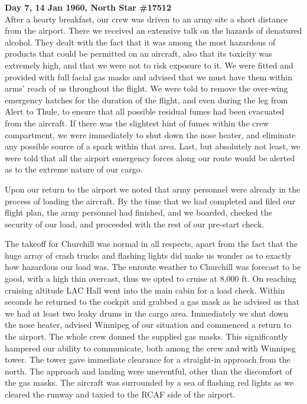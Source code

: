\noindent\textbf{Day 7, 14 Jan 1960, North Star \#17512}\\

After a hearty breakfast, our crew was driven to an army site a short
distance from the airport. There we received an extensive talk on the
hazards of denatured alcohol. They dealt with the fact that it was
among the most hazardous of products that could be permitted on an
aircraft, also that its toxicity was extremely high, and that we were
not to risk exposure to it. We were fitted and provided with full
facial gas masks and advised that we must have them within arms' reach
of us throughout the flight. We were told to remove the over-wing
emergency hatches for the duration of the flight, and even during the
leg from Alert to Thule, to ensure that all possible residual fumes had
been evacuated from the aircraft. If there was the slightest hint of
fumes within the crew compartment, we were immediately to shut down the
nose heater, and eliminate any possible source of a spark within that
area. Last, but absolutely not least, we were told that all the airport
emergency forces along our route would be alerted as to the extreme
nature of our cargo.

Upon our return to the airport we noted that army personnel were
already in the process of loading the aircraft. By the time that we had
completed and filed our flight plan, the army personnel had finished,
and we boarded, checked the security of our load, and proceeded with
the rest of our pre-start check.

The takeoff for Churchill was normal in all respects, apart from the
fact that the huge array of crash trucks and flashing lights did make
us wonder as to exactly how hazardous our load was. The enroute weather
to Churchill was forecast to be good, with a high thin overcast, thus
we opted to cruise at 8,000 ft. On reaching cruising altitude LAC Hall
went into the main cabin for a load check.  Within seconds he returned
to the cockpit and grabbed a gas mask as he advised us that we had at
least two leaky drums in the cargo area. Immediately we shut down the
nose heater, advised Winnipeg of our situation and commenced a return
to the airport. The whole crew donned the supplied gas masks. This
significantly hampered our ability to communicate, both among the crew
and with Winnipeg tower. The tower gave immediate clearance for a
straight-in approach from the north. The approach and landing were
uneventful, other than the discomfort of the gas masks. The aircraft
was surrounded by a sea of flashing red lights as we cleared the runway
and taxied to the RCAF side of the airport.

